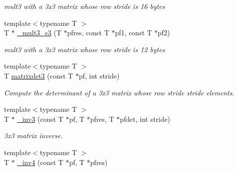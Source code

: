 \begin{DoxyCompactItemize}
\begin{DoxyCompactList}\small\item\em mult3 with a 3x3 matrix whose row stride is 16 bytes \item\end{DoxyCompactList}\item 
\hypertarget{namespaceOpenRAVE_1_1mathextra_ae5a24b1c71ce7b35a40ae7008ddf47ae}{
{\footnotesize template$<$typename T $>$ }\\T $\ast$ \hyperlink{namespaceOpenRAVE_1_1mathextra_ae5a24b1c71ce7b35a40ae7008ddf47ae}{\_\-mult3\_\-s3} (T $\ast$pfres, const T $\ast$pf1, const T $\ast$pf2)}
\label{namespaceOpenRAVE_1_1mathextra_ae5a24b1c71ce7b35a40ae7008ddf47ae}

\begin{DoxyCompactList}\small\item\em mult3 with a 3x3 matrix whose row stride is 12 bytes \item\end{DoxyCompactList}\item 
\hypertarget{namespaceOpenRAVE_1_1mathextra_ad9d110d6d2dd3e1f4777ff1c42aa2fff}{
{\footnotesize template$<$typename T $>$ }\\T \hyperlink{namespaceOpenRAVE_1_1mathextra_ad9d110d6d2dd3e1f4777ff1c42aa2fff}{matrixdet3} (const T $\ast$pf, int stride)}
\label{namespaceOpenRAVE_1_1mathextra_ad9d110d6d2dd3e1f4777ff1c42aa2fff}

\begin{DoxyCompactList}\small\item\em Compute the determinant of a 3x3 matrix whose row stride stride elements. \item\end{DoxyCompactList}\item 
{\footnotesize template$<$typename T $>$ }\\T $\ast$ \hyperlink{namespaceOpenRAVE_1_1mathextra_abb859ce4ca095416219250a83ca94793}{\_\-inv3} (const T $\ast$pf, T $\ast$pfres, T $\ast$pfdet, int stride)
\begin{DoxyCompactList}\small\item\em 3x3 matrix inverse. \item\end{DoxyCompactList}\item 
\hypertarget{namespaceOpenRAVE_1_1mathextra_a81c950faa17b5d293eb547c9b3bcab41}{
{\footnotesize template$<$typename T $>$ }\\T $\ast$ \hyperlink{namespaceOpenRAVE_1_1mathextra_a81c950faa17b5d293eb547c9b3bcab41}{\_\-inv4} (const T $\ast$pf, T $\ast$pfres)}
\label{namespaceOpenRAVE_1_1mathextra_a81c950faa17b5d293eb547c9b3bcab41}


\end{DoxyCompactItemize}
